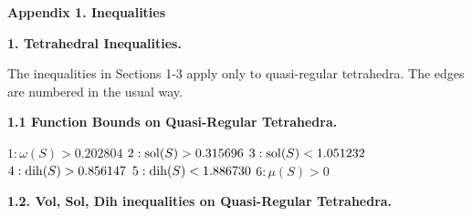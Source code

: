 \bigskip

\centerline{\bf Appendix 1. Inequalities}

\bigskip

{\bf 1. Tetrahedral Inequalities.}

\smallskip

The inequalities in Sections 1-3 apply only to quasi-regular tetrahedra.
The edges are numbered in the usual way.

\smallskip

{\bf 1.1 Function Bounds on Quasi-Regular Tetrahedra.}


$1:  \omega(S) > 0.202804$\newline
$2:  \operatorname{sol}(S) > 0.315696$\newline
$3:  \operatorname{sol}(S) < 1.051232$\newline
$4:  \operatorname{dih}(S) > 0.856147$\newline
$5:  \operatorname{dih}(S) < 1.886730$\newline
$6:  \mu(S) > 0$\newline


\smallskip

{\bf 1.2. Vol, Sol, Dih inequalities on Quasi-Regular Tetrahedra.}

\smallskip

